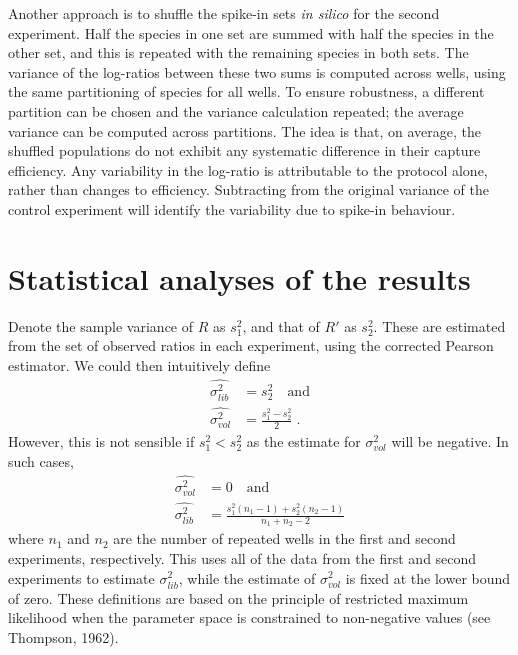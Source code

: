 \documentclass{article}
\begin{document}
Another approach is to shuffle the spike-in sets \textit{in silico} for the second experiment.
Half the species in one set are summed with half the species in the other set, and this is repeated with the remaining species in both sets.
The variance of the log-ratios between these two sums is computed across wells, using the same partitioning of species for all wells.
To ensure robustness, a different partition can be chosen and the variance calculation repeated; the average variance can be computed across partitions.
The idea is that, on average, the shuffled populations do not exhibit any systematic difference in their capture efficiency.
Any variability in the log-ratio is attributable to the protocol alone, rather than changes to efficiency.
Subtracting from the original variance of the control experiment will identify the variability due to spike-in behaviour.

\newpage
\section{Statistical analyses of the results}
Denote the sample variance of $R$ as $s^2_1$, and that of $R'$ as $s^2_2$.
These are estimated from the set of observed ratios in each experiment, using the corrected Pearson estimator.
We could then intuitively define
\begin{align*}
\widehat{\sigma^2_{lib}} &= s^2_2 \quad\mbox{and} \\
\widehat{\sigma^2_{vol}} &= \frac{s^2_1 - s^2_2}{2} \;.
\end{align*}
However, this is not sensible if $s^2_1 < s^2_2$ as the estimate for $\sigma^2_{vol}$ will be negative.
In such cases, 
\begin{align*}
\widehat{\sigma^2_{vol}} &= 0 \quad\mbox{and} \\
\widehat{\sigma^2_{lib}} &= \frac{s^2_1(n_1 - 1) + s^2_2(n_2-1)}{n_1 + n_2 - 2} 
\end{align*}
where $n_1$ and $n_2$ are the number of repeated wells in the first and second experiments, respectively.
This uses all of the data from the first and second experiments to estimate $\sigma^2_{lib}$, while the estimate of $\sigma^2_{vol}$ is fixed at the lower bound of zero.
These definitions are based on the principle of restricted maximum likelihood when the parameter space is constrained to non-negative values (see Thompson, 1962).
\end{document}
